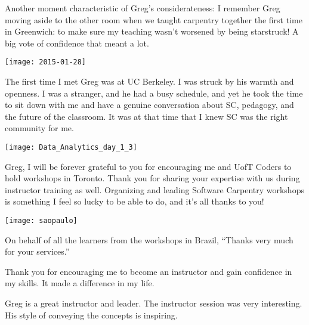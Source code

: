 Another moment characteristic of Greg's considerateness: I remember Greg moving
aside to the other room when we taught carpentry together the first time in
Greenwich: to make sure my teaching wasn't worsened by being starstruck! A big
vote of confidence that meant a lot.

\vspace*{\fill}

\newpage
\texttt{[image: 2015-01-28]}

The first time I met Greg was at UC Berkeley. I was struck by his warmth and
openness. I was a stranger, and he had a busy schedule, and yet he took the
time to sit down with me and have a genuine conversation about SC, pedagogy,
and the future of the classroom. It was at that time that I knew SC was the
right community for me.


\newpage
\vspace*{\fill}

\texttt{[image: Data\_Analytics\_day\_1\_3]}

Greg, I will be forever grateful to you for encouraging me and UofT Coders to
hold workshops in Toronto. Thank you for sharing your expertise with us during
instructor training as well. Organizing and leading Software Carpentry
workshops is something I feel so lucky to be able to do, and it's all thanks to
you!

\vspace*{\fill}

\newpage
\texttt{[image: saopaulo]}

On behalf of all the learners from the workshops in Brazil, ``Thanks very much
for your services.''



Thank you for encouraging me to become an instructor and gain confidence in my
skills. It made a difference in my life.



Greg is a great instructor and leader. The instructor session was very
interesting. His style of conveying the concepts is inspiring.


\newpage
\vspace*{\fill}


